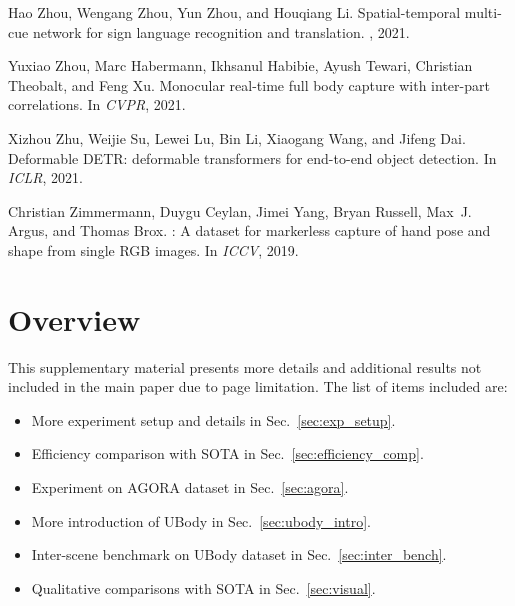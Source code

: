 \documentclass[10pt,twocolumn,letterpaper]{article}
\begin{document}
\begin{thebibliography}{10}
Hao Zhou, Wengang Zhou, Yun Zhou, and Houqiang Li.
\newblock Spatial-temporal multi-cue network for sign language recognition and
  translation.
, 2021.

Yuxiao Zhou, Marc Habermann, Ikhsanul Habibie, Ayush Tewari, Christian
  Theobalt, and Feng Xu.
\newblock Monocular real-time full body capture with inter-part correlations.
\newblock In {\em CVPR}, 2021.

Xizhou Zhu, Weijie Su, Lewei Lu, Bin Li, Xiaogang Wang, and Jifeng Dai.
\newblock Deformable {DETR:} deformable transformers for end-to-end object
  detection.
\newblock In {\em ICLR}, 2021.

Christian Zimmermann, Duygu Ceylan, Jimei Yang, Bryan Russell, Max~J. Argus,
  and Thomas Brox.
: A dataset for markerless capture of hand pose and shape
  from single {RGB} images.
\newblock In {\em ICCV}, 2019.

\end{thebibliography}
 
{\small

}



\setcounter{section}{0}
\setcounter{table}{0}
\setcounter{figure}{0}

\renewcommand{\thesection}{\Alph{section}}   
\renewcommand {\thetable} {S-\arabic{table}}
\renewcommand {\thefigure} {S-\arabic{figure}}

\pagebreak


\section*{Overview}
\noindent This supplementary material presents more details and additional results not included in the main paper due to page limitation. The list of items included are:


\begin{itemize}
    \item More experiment setup and details in Sec.~\ref{sec:exp_setup}.
    \item Efficiency comparison with SOTA in Sec.~\ref{sec:efficiency_comp}.
    \item Experiment on AGORA dataset in Sec.~\ref{sec:agora}. 
    \item More introduction of UBody in Sec.~\ref{sec:ubody_intro}. 
    \item Inter-scene benchmark on UBody dataset in Sec.~\ref{sec:inter_bench}. 
    \item Qualitative comparisons with SOTA in Sec.~\ref{sec:visual}.
\end{itemize}
\end{document}
